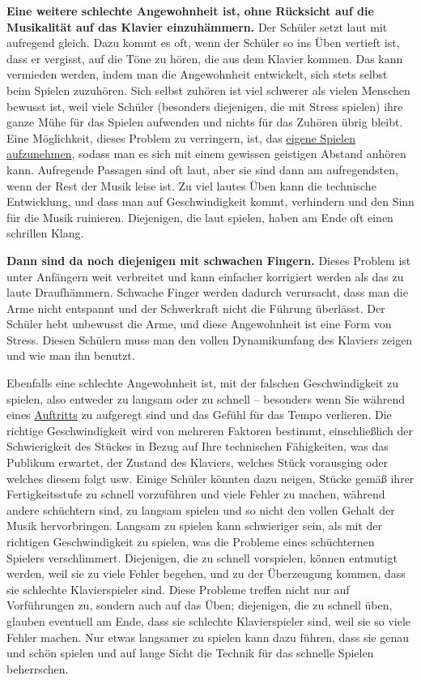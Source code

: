 \textbf{Eine weitere schlechte Angewohnheit ist, ohne Rücksicht auf die Musikalität auf das Klavier einzuhämmern.}
Der Schüler setzt laut mit aufregend gleich.
Dazu kommt es oft, wenn der Schüler so ins Üben vertieft ist, dass er vergisst, auf die Töne zu hören, die aus dem Klavier kommen.
Das kann vermieden werden, indem man die Angewohnheit entwickelt, sich stets selbst beim Spielen zuzuhören.
Sich selbst zuhören ist viel schwerer als vielen Menschen bewusst ist, weil viele Schüler (besonders diejenigen, die mit Stress spielen) ihre ganze Mühe für das Spielen aufwenden und nichts für das Zuhören übrig bleibt.
Eine Möglichkeit, dieses Problem zu verringern, ist, das \hyperref[c1iii13]{eigene Spielen aufzunehmen}, sodass man es sich mit einem gewissen geistigen Abstand anhören kann.
Aufregende Passagen sind oft laut, aber sie sind dann am aufregendsten, wenn der Rest der Musik leise ist.
Zu viel lautes Üben kann die technische Entwicklung, und dass man auf Geschwindigkeit kommt, verhindern und den Sinn für die Musik ruinieren.
Diejenigen, die laut spielen, haben am Ende oft einen schrillen Klang.

\textbf{Dann sind da noch diejenigen mit schwachen Fingern.}
Dieses Problem ist unter Anfängern weit verbreitet und kann einfacher korrigiert werden als das zu laute Draufhämmern.
Schwache Finger werden dadurch verursacht, dass man die Arme nicht entspannt und der Schwerkraft nicht die Führung überlässt.
Der Schüler hebt unbewusst die Arme, und diese Angewohnheit ist eine Form von Stress.
Diesen Schülern muss man den vollen Dynamikumfang des Klaviers zeigen und wie man ihn benutzt.

Ebenfalls eine schlechte Angewohnheit ist, mit der falschen Geschwindigkeit zu spielen, also entweder zu langsam oder zu schnell -- besonders wenn Sie während eines \hyperref[c1iii14]{Auftritts} zu aufgeregt sind und das Gefühl für das Tempo verlieren.
Die richtige Geschwindigkeit wird von mehreren Faktoren bestimmt, einschließlich der Schwierigkeit des Stückes in Bezug auf Ihre technischen Fähigkeiten, was das Publikum erwartet, der Zustand des Klaviers, welches Stück vorausging oder welches diesem folgt usw.
Einige Schüler könnten dazu neigen, Stücke gemäß ihrer Fertigkeitsstufe zu schnell vorzuführen und viele Fehler zu machen, während andere schüchtern sind, zu langsam spielen und so nicht den vollen Gehalt der Musik hervorbringen.
Langsam zu spielen kann schwieriger sein, als mit der richtigen Geschwindigkeit zu spielen, was die Probleme eines schüchternen Spielers verschlimmert.
Diejenigen, die zu schnell vorspielen, können entmutigt werden, weil sie zu viele Fehler begehen, und zu der Überzeugung kommen, dass sie schlechte Klavierspieler sind.
Diese Probleme treffen nicht nur auf Vorführungen zu, sondern auch auf das Üben;
diejenigen, die zu schnell üben, glauben eventuell am Ende, dass sie schlechte Klavierspieler sind, weil sie so viele Fehler machen.
Nur etwas langsamer zu spielen kann dazu führen, dass sie genau und schön spielen und auf lange Sicht die Technik für das schnelle Spielen beherrschen.


